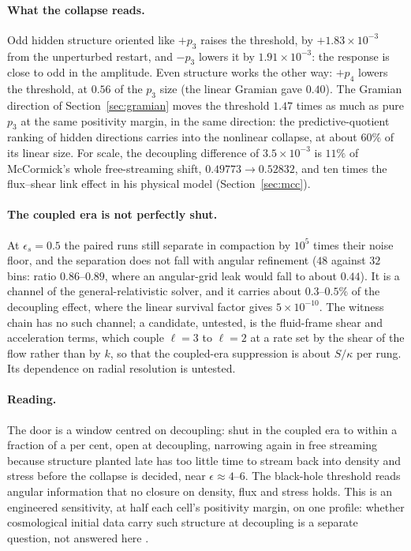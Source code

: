 \paragraph{What the collapse reads.} Odd hidden structure oriented like $+p_3$ raises the threshold, by $+1.83\times10^{-3}$ from the unperturbed restart, and $-p_3$ lowers it by $1.91\times10^{-3}$: the response is close to odd in the amplitude. Even structure works the other way: $+p_4$ lowers the threshold, at $0.56$ of the $p_3$ size (the linear Gramian gave $0.40$). The Gramian direction of Section~\ref{sec:gramian} moves the threshold $1.47$ times as much as pure $p_3$ at the same positivity margin, in the same direction: the predictive-quotient ranking of hidden directions carries into the nonlinear collapse, at about $60\%$ of its linear size. For scale, the decoupling difference of $3.5\times10^{-3}$ is $11\%$ of McCormick's whole free-streaming shift, $0.49773\to0.52832$, and ten times the flux--shear link effect in his physical model (Section~\ref{sec:mcc}).

\paragraph{The coupled era is not perfectly shut.} At $\epsilon_s=0.5$ the paired runs still separate in compaction by $10^5$ times their noise floor, and the separation does not fall with angular refinement ($48$ against $32$ bins: ratio $0.86$--$0.89$, where an angular-grid leak would fall to about $0.44$). It is a channel of the general-relativistic solver, and it carries about $0.3$--$0.5\%$ of the decoupling effect, where the linear survival factor gives $5\times10^{-10}$. The witness chain has no such channel; a candidate, untested, is the fluid-frame shear and acceleration terms, which couple $\ell=3$ to $\ell=2$ at a rate set by the shear of the flow rather than by $k$, so that the coupled-era suppression is about $S/\kappa$ per rung. Its dependence on radial resolution is untested.

\paragraph{Reading.} The door is a window centred on decoupling: shut in the coupled era to within a fraction of a per cent, open at decoupling, narrowing again in free streaming because structure planted late has too little time to stream back into density and stress before the collapse is decided, near $\epsilon\approx4$--$6$. The black-hole threshold reads angular information that no closure on density, flux and stress holds. This is an engineered sensitivity, at half each cell's positivity margin, on one profile: whether cosmological initial data carry such structure at decoupling is a separate question, not answered here .

